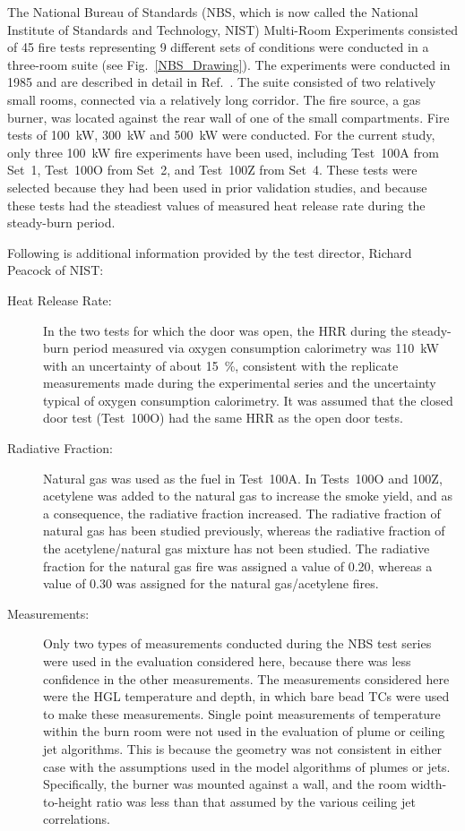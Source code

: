 The National Bureau of Standards (NBS, which is now called the National Institute of Standards and Technology, NIST) Multi-Room Experiments consisted of 45 fire tests representing 9 different sets of conditions were conducted in a three-room suite (see Fig.~\ref{NBS_Drawing}). The experiments were conducted in 1985 and are described in detail in Ref.~\cite{Peacock:NBS_Multi-Room}. The suite consisted of two relatively small rooms, connected via a relatively long corridor. The fire source, a gas burner, was located against the rear wall of one of the small compartments.  Fire tests of 100~kW, 300~kW and 500~kW were conducted. For the current study, only three 100~kW fire experiments have been used, including Test~100A from Set~1, Test~100O from Set~2, and Test~100Z from Set~4. These tests were selected because they had been used in prior validation studies, and because these tests had the steadiest values of measured heat release rate during the steady-burn period.

Following is additional information provided by the test director, Richard Peacock of NIST:
\begin{description}
\item[Heat Release Rate:] In the two tests for which the door was open, the HRR during the steady-burn period measured via oxygen consumption calorimetry was 110~kW with an uncertainty of about 15~\%, consistent with the replicate measurements made during the experimental series and the uncertainty typical of oxygen consumption calorimetry. It was assumed that the closed door test (Test~100O) had the same HRR as the open door tests.
\item[Radiative Fraction:] Natural gas was used as the fuel in Test~100A. In Tests~100O and 100Z, acetylene was added to the natural gas to increase the smoke yield, and as a consequence, the radiative fraction increased. The radiative fraction of natural gas has been studied previously, whereas the radiative fraction of the acetylene/natural gas mixture has not been studied. The radiative fraction for the natural gas fire was assigned a value of 0.20, whereas a value of 0.30 was assigned for the natural gas/acetylene fires.
\item[Measurements:] Only two types of measurements conducted during the NBS test series were used in the evaluation considered here, because there was less confidence in the other measurements. The measurements considered here were the HGL temperature and depth, in which bare bead TCs were used to make these measurements. Single point measurements of temperature within the burn room were not used in the evaluation of plume or ceiling jet algorithms. This is because the geometry was not consistent in either case with the assumptions used in the model algorithms of plumes or jets. Specifically, the burner was mounted against a wall, and the room width-to-height ratio was less than that assumed by the various ceiling jet correlations.
\end{description}

